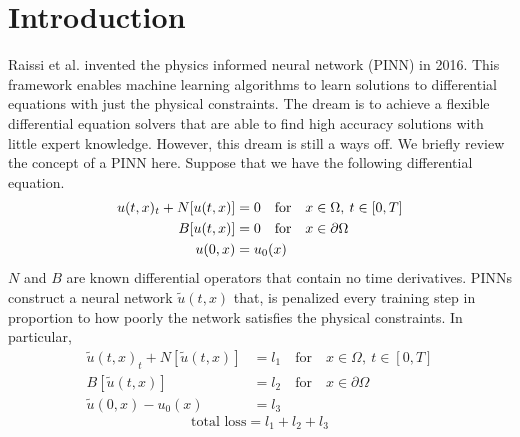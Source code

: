 \documentclass[12pt]{article}
\def\~{\tilde}
\begin{document}
\vfill
\newpage
\section{Introduction}

Raissi et al. \cite{pinns} invented the physics informed neural network (PINN) in 2016. This framework enables machine learning algorithms to learn solutions to differential equations with just the physical constraints. The dream is to achieve a flexible differential equation solvers that are able to find high accuracy solutions with little expert knowledge. However, this dream is still a ways off. We briefly review the concept of a PINN here. Suppose that we have the following differential equation.
\begin{align} \label{eq:dq}
	u(t,x)_t + N[u(t,x)] &= 0 \quad \text{for} \quad x \in \Omega, \: t \in [0,T] \notag\\
	B[u(t,x)] &= 0 \quad \text{for} \quad x \in \partial \Omega\\
	u(0,x) &= u_0(x) \notag
\end{align}
$N$ and $B$ are known differential operators that contain no time derivatives. PINNs construct a neural network $\~u(t,x)$ that, is penalized every training step in proportion to how poorly the network satisfies the physical constraints. In particular,
\begin{align*}
	\~u(t,x)_t + N[\~u(t,x)] &= l_1 \quad \text{for} \quad x \in \Omega, \: t \in [0,T]\\
	B[\~u(t,x)] &= l_2 \quad \text{for} \quad x \in \partial \Omega\\
	\~u(0,x) - u_0(x)& = l_3
\end{align*}
\begin{equation*}
\text{total loss} = l_1 + l_2 + l_3
\end{equation*}
\end{document}
